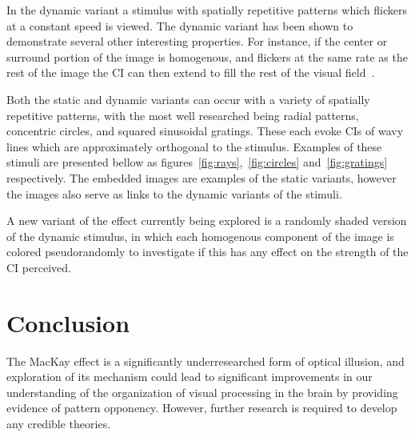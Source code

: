 \documentclass[twocolumn]{article}
\begin{document}
In the dynamic variant a stimulus with spatially repetitive patterns which flickers at a constant speed is viewed. 
The dynamic variant has been shown to demonstrate several other interesting properties. For instance, if the center or surround portion
of the image is homogenous, and flickers at the same rate as the rest of the image the CI can then extend to fill the rest of the visual field~\cite{billock_2007}.

Both the static and dynamic variants can occur with a variety of spatially repetitive patterns, with the most well researched being radial patterns, concentric circles, and squared sinusoidal gratings. 
These each evoke CIs of wavy lines which are approximately orthogonal to the stimulus. Examples of these stimuli are presented bellow as figures~\ref{fig:rays},~\ref{fig:circles} and~\ref{fig:gratings} respectively.
The embedded images are examples of the static variants, however the images also serve as links to the dynamic variants of the stimuli.

A new variant of the effect currently being explored is a randomly shaded version of the dynamic stimulus, in which each homogenous
component of the image is colored pseudorandomly to investigate if this has any effect on the strength of the CI perceived.

\section[]{Conclusion}
The MacKay effect is a significantly underresearched form of optical illusion, and exploration of its mechanism
could lead to significant improvements in our understanding of the organization of visual processing in the brain by 
providing evidence of pattern opponency. However, further research is required to develop any credible theories. 
\end{document}
